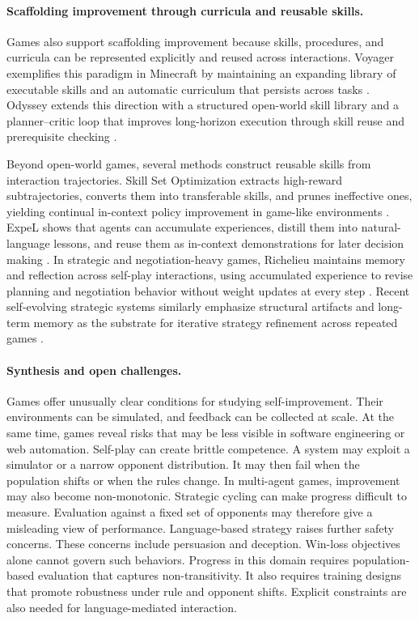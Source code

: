 \paragraph{Scaffolding improvement through curricula and reusable skills.}
Games also support scaffolding improvement because skills, procedures, and curricula can be represented explicitly and reused across interactions. Voyager exemplifies this paradigm in Minecraft by maintaining an expanding library of executable skills and an automatic curriculum that persists across tasks \citep{wang2023voyageropenendedembodiedagent}. Odyssey extends this direction with a structured open-world skill library and a planner--critic loop that improves long-horizon execution through skill reuse and prerequisite checking \citep{liu2025odysseyempoweringminecraftagents}.

Beyond open-world games, several methods construct reusable skills from interaction trajectories. Skill Set Optimization extracts high-reward subtrajectories, converts them into transferable skills, and prunes ineffective ones, yielding continual in-context policy improvement in game-like environments \citep{nottingham2024skillsetoptimizationreinforcing}. ExpeL shows that agents can accumulate experiences, distill them into natural-language lessons, and reuse them as in-context demonstrations for later decision making \citep{zhao2024expel}. In strategic and negotiation-heavy games, Richelieu maintains memory and reflection across self-play interactions, using accumulated experience to revise planning and negotiation behavior without weight updates at every step \citep{guan2024richelieu}. Recent self-evolving strategic systems similarly emphasize structural artifacts and long-term memory as the substrate for iterative strategy refinement across repeated games \citep{belle2025agentschangeselfevolvingllm}.


\paragraph{Synthesis and open challenges.}
Games offer unusually clear conditions for studying self-improvement. Their environments can be simulated, and feedback can be collected at scale. At the same time, games reveal risks that may be less visible in software engineering or web automation. Self-play can create brittle competence. A system may exploit a simulator or a narrow opponent distribution. It may then fail when the population shifts or when the rules change. In multi-agent games, improvement may also become non-monotonic. Strategic cycling can make progress difficult to measure. Evaluation against a fixed set of opponents may therefore give a misleading view of performance. Language-based strategy raises further safety concerns. These concerns include persuasion and deception. Win-loss objectives alone cannot govern such behaviors. Progress in this domain requires population-based evaluation that captures non-transitivity. It also requires training designs that promote robustness under rule and opponent shifts. Explicit constraints are also needed for language-mediated interaction.



